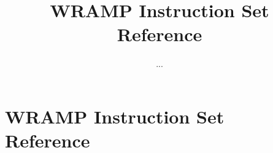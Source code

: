 \documentclass[a4paper]{book}
\title{WRAMP Instruction Set Reference}
\author{...}
\begin{document}
\chapter*{WRAMP Instruction Set Reference}
\addtolength{\hoffset}{-1cm}
\addtolength{\textwidth}{1cm}

\end{document}
